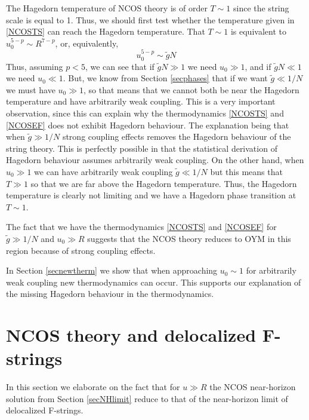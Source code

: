 \documentclass[a4paper,twoside,titlepage,12pt]{article}
\begin{document}
The Hagedorn temperature of NCOS theory is of order \( T \sim 1 \)
since the string scale is equal to 1. 
Thus, we should first test whether the temperature 
given in \eqref{NCOSTS} can reach the Hagedorn temperature.
That $T \sim 1 $ is equivalent to 
\( u_0^{5-p} \sim R^{7-p} \), or, equivalently,
%
\begin{equation}
u_0^{5-p} \sim \tilde{g} N
\end{equation}
%
Thus, assuming $p < 5$, we can see that if \( \tilde{g} N \gg 1\)
we need \( u_0 \gg 1 \), and if \( \tilde{g} N \ll 1 \)
we need \( u_0 \ll 1 \).
But, we know from Section \ref{secphases} 
that if we want \( \tilde{g} \ll 1/N \)
we must have \( u_0 \gg 1 \), so that means that we cannot both
be near the Hagedorn temperature and have arbitrarily weak coupling.
This is a very important observation, since this can explain why
the thermodynamics \eqref{NCOSTS} and \eqref{NCOSEF} does not
exhibit Hagedorn behaviour. 
The explanation being that when \( \tilde{g} \gg 1/N \) strong coupling
effects removes the Hagedorn behaviour of the string theory. This
is perfectly possible in that the statistical derivation of  
Hagedorn behaviour assumes arbitrarily weak coupling.
On the other hand, when \( u_0 \gg 1 \) we can have arbitrarily
weak coupling \( \tilde{g} \ll 1/N \) but this means that
\( T \gg 1 \) so that we are far above the Hagedorn temperature.
Thus, the Hagedorn temperature is clearly not limiting and we have
a Hagedorn phase transition at \( T \sim 1 \).

The fact that we have the thermodynamics \eqref{NCOSTS} and
\eqref{NCOSEF} for \( \tilde{g} \gg 1/N \) and \( u_0 \gg R \)
suggests that the NCOS theory reduces to OYM in this region 
because of strong coupling effects.

In Section \ref{secnewtherm} we show that when approaching \( u_0 \sim 1 \)
for arbitrarily weak coupling new thermodynamics can occur. 
This supports our explanation of the missing Hagedorn behaviour
in the thermodynamics.

\section{NCOS theory and delocalized F-strings}
\label{secdelF1}

In this section we elaborate on the fact that for \( u \gg R \)
the NCOS near-horizon solution from Section \ref{secNHlimit} reduce to that
of the near-horizon limit of delocalized F-strings.
\end{document}
